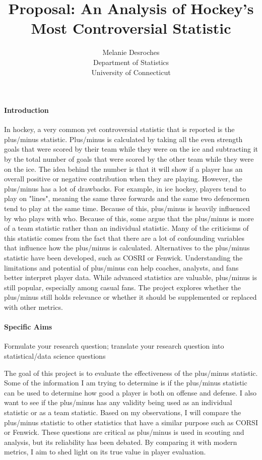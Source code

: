 \documentclass[12pt]{article}
\title{Proposal: An Analysis of Hockey's Most Controversial Statistic}
\author{Melanie Desroches\\
  Department of Statistics\\
  University of Connecticut
}
\begin{document}
\maketitle


\paragraph{Introduction}
In hockey, a very common yet controversial statistic that is reported is the plus/minus statistic. Plus/minus is 
calculated by taking all the even strength goals that were scored by their team while they were on the ice and 
subtracting it by the total number of goals that were scored by the other team while they were on the ice. The 
idea behind the number is that it will show if a player has an overall positive or negative contribution when 
they are playing. However, the plus/minus has a lot of drawbacks. For example, in ice hockey, players tend to play 
on "lines", meaning the same three forwards and the same two defencemen tend to play at the same time. Because of this, 
plus/minus is heavily influenced by who plays with who. Because of this, some argue that the plus/minus is more of a team 
statistic rather than an individual statistic. Many of the criticisms of this statistic comes from the fact that
there are a lot of confounding variables that influence how the plus/minus is calculated. Alternatives to the plus/minus 
statistic have been developed, such as COSRI or Fenwick. Understanding the limitations and potential of plus/minus can 
help coaches, analysts, and fans better interpret player data. While advanced statistics are valuable, plus/minus is still 
popular, especially among casual fans. The project explores whether the plus/minus still holds relevance or whether it should 
be supplemented or replaced with other metrics.


\paragraph{Specific Aims}
Formulate your research question;
translate your research question into statistical/data science questions

The goal of this project is to evaluate the effectiveness of the plus/minus statistic. Some of the information
I am trying to determine is if the plus/minus statistic can be used to determine how good a player is both on
offense and defense. I also want to see if the plus/minus has any validity being used as an individual
statistic or as a team statistic. Based on my observations, I will compare the plus/minus statistic to other
statistics that have a similar purpose such as CORSI or Fenwick.
These questions are critical as plus/minus is used in scouting and analysis, but its reliability 
has been debated. By comparing it with modern metrics, I aim to shed light on its true value in player evaluation.
\end{document}
